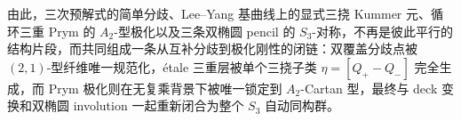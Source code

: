 \noindent
由此，三次预解式的简单分歧、Lee--Yang 基曲线上的显式三挠 Kummer 元、循环三重 Prym 的 \(A_2\)-型极化以及三条双椭圆 pencil 的 \(S_3\)-对称，不再是彼此平行的结构片段，而共同组成一条从互补分歧到极化刚性的闭链：双覆盖分歧点被 \((2,1)\)-型纤维唯一规范化，étale 三重层被单个三挠子类 \(\eta=[Q_+-Q_-]\) 完全生成，而 Prym 极化则在无复乘背景下被唯一锁定到 \(A_2\)-Cartan 型，最终与 deck 变换和双椭圆 involution 一起重新闭合为整个 \(S_3\) 自动同构群。

\endinput
